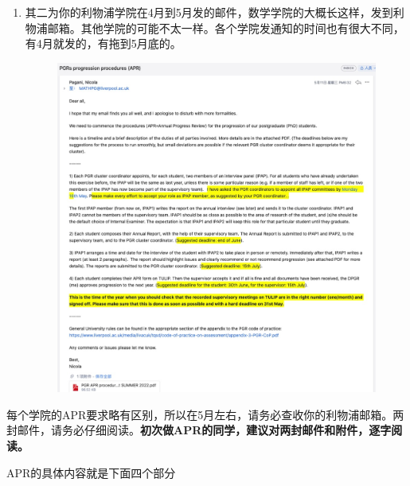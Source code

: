 \begin{enumerate}
    \item 
        \begin{minipage}{0.3\textwidth}
            其二为你的利物浦学院在4月到5月发的邮件，数学学院的大概长这样，发到利物浦邮箱。其他学院的可能不太一样。各个学院发通知的时间也有很大不同，有4月就发的，有拖到5月底的。
        \end{minipage}
        \begin{minipage}{0.63\textwidth}
            \begin{figure}[H]
                \includegraphics[width=0.95\columnwidth, right]{author-folder/Kai.Wu/APR_liverpool_email.jpg}
            \end{figure}
        \end{minipage}

\end{enumerate}

每个学院的APR要求略有区别，所以在5月左右，请务必查收你的利物浦邮箱。两封邮件，请务必仔细阅读。\textbf{初次做APR的同学，建议对两封邮件和附件，逐字阅读。}

APR的具体内容就是下面四个部分
